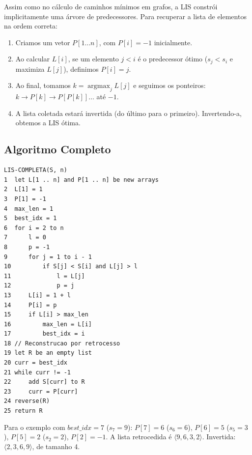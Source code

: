 \documentclass[11pt,a4paper]{article}
\begin{document}
\begin{teoria}
Assim como no cálculo de caminhos mínimos em grafos, a LIS constrói implicitamente uma árvore de predecessores. Para recuperar a lista de elementos na ordem correta:
\begin{enumerate}
    \item Criamos um vetor $P[1 \dots n]$, com $P[i] = -1$ inicialmente.
    \item Ao calcular $L[i]$, se um elemento $j < i$ é o predecessor ótimo ($s_j < s_i$ e maximiza $L[j]$), definimos $P[i] = j$.
    \item Ao final, tomamos $k = \operatorname{argmax}_j L[j]$ e seguimos os ponteiros: $k \to P[k] \to P[P[k]] \dots$ até $-1$.
    \item A lista coletada estará invertida (do último para o primeiro). Invertendo-a, obtemos a LIS ótima.
\end{enumerate}
\end{teoria}

\subsection*{Algoritmo Completo}

\begin{lstlisting}[caption={Algoritmo LIS com Retorno da Sequência Completa}]
LIS-COMPLETA(S, n)
1  let L[1 .. n] and P[1 .. n] be new arrays
2  L[1] = 1
3  P[1] = -1
4  max_len = 1
5  best_idx = 1
6  for i = 2 to n
7      l = 0
8      p = -1
9      for j = 1 to i - 1
10         if S[j] < S[i] and L[j] > l
11             l = L[j]
12             p = j
13     L[i] = 1 + l
14     P[i] = p
15     if L[i] > max_len
16         max_len = L[i]
17         best_idx = i
18 // Reconstrucao por retrocesso
19 let R be an empty list
20 curr = best_idx
21 while curr != -1
22     add S[curr] to R
23     curr = P[curr]
24 reverse(R)
25 return R
\end{lstlisting}

\begin{dica}
Para o exemplo com $best\_idx = 7$ ($s_7 = 9$):
$P[7] = 6$ ($s_6=6$), $P[6] = 5$ ($s_5=3$), $P[5] = 2$ ($s_2=2$), $P[2] = -1$.
A lista retrocedida é $\langle 9, 6, 3, 2 \rangle$. Invertida: $\langle 2, 3, 6, 9 \rangle$, de tamanho 4.
\end{dica}

\vspace{0.4cm}

\end{document}
